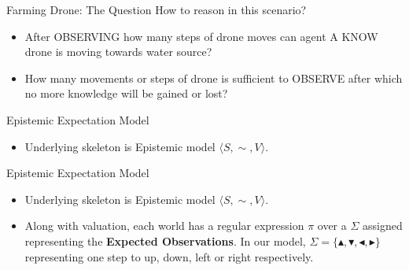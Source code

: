 \documentclass{beamer}
\newcommand\ldiaarg[1]{\langle#1\rangle}
\newcommand{\union}{\cup}
\newcommand{\ep}{\ensuremath{\varepsilon}}
\newcommand{\obsright}{\blacktriangleright}
\newcommand{\obsleft}{\blacktriangleleft}
\newcommand{\obsup}{\blacktriangle}
\newcommand{\obsdown}{\blacktriangledown}
\newcommand{\expwater}{(\obsright \union \obsup)^* (\obsdown \union \obsleft \union \ep) (\obsright \union \obsup)^*}
\newcommand{\exppower}{(\obsleft \union \obsdown)^* (\obsup \union \obsright \union \ep) (\obsleft \union \obsdown)^*}
\newcommand{\exppatrol}{(\obsright^+ \obsdown^+ \obsleft^+ \obsup^+)^*}
\begin{document}
\begin{frame}{Farming Drone: The Question}
    How to reason in this scenario?\pause
    \begin{itemize}
        \item<2-> After OBSERVING how many steps of drone moves can agent A KNOW drone is moving towards water source?
        \item<3-> How many movements or steps of drone is sufficient to OBSERVE after which no more knowledge will be gained or lost? 
    \end{itemize}
\end{frame}

\begin{frame}{Epistemic Expectation Model}
    \begin{itemize}
        \item Underlying skeleton is Epistemic model $\ldiaarg{S,\sim, V}$.
    \end{itemize}
    \begin{figure}
\end{figure}
\end{frame}

\begin{frame}{Epistemic Expectation Model}
    \begin{itemize}
        \item Underlying skeleton is Epistemic model $\ldiaarg{S,\sim, V}$.
        \item Along with valuation, each world has a regular expression $\pi$ over a $\Sigma$ assigned representing the \textbf{Expected Observations}. In our model, $\Sigma = \{\obsup, \obsdown, \obsleft, \obsright\}$ representing one step to up, down, left or right respectively.
    \end{itemize}
    \begin{figure}
    \end{figure}
\end{frame}
\end{document}
